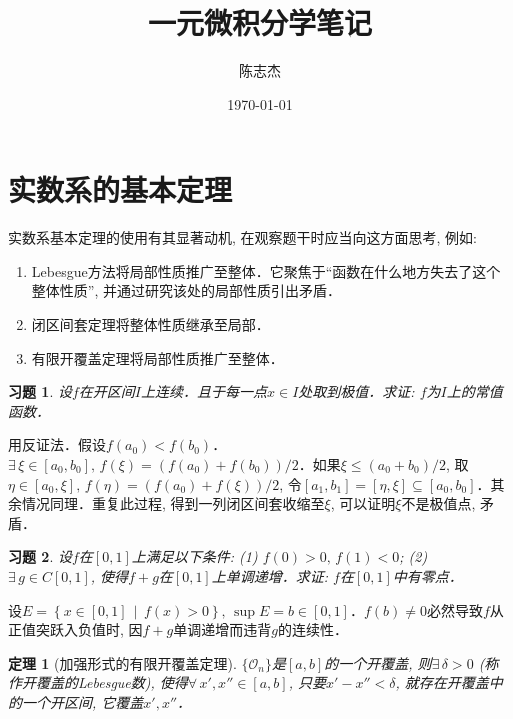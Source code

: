 \documentclass[11pt,a4paper]{ctexart}
\title{一元微积分学笔记}
\author{陈志杰}
\date{\today}
\makeatletter
\theoremstyle{thmseries} %
\newtheorem{thm}{定理}[section]
\theoremstyle{exerseries}
\newtheorem{exer}{习题}[section]
\renewenvironment{proof}[1][\proofname]{\par
  \pushQED{\qed}%
  \normalfont \topsep6\p@\@plus6\p@\relax
  \trivlist
  \item[\hskip\labelsep
        \itshape
    #1\@addpunct{}]\ignorespaces
}{%
  \popQED\endtrivlist\@endpefalse
}
\newenvironment{pf}{\begin{proof}[\bfseries\upshape 证\quad]}{\end{proof}}
\newcommand{\cbra}[1]{\mathopen{}\left\{#1\right\}}
\makeatother
\begin{document}
\maketitle
\thispagestyle{empty}
\tableofcontents
\justifying
\newpage


\section{实数系的基本定理}
实数系基本定理的使用有其显著动机, 在观察题干时应当向这方面思考, 例如: 
\begin{enumerate}
	\item Lebesgue方法将局部性质推广至整体．它聚焦于``函数在什么地方失去了这个整体性质'', 并通过研究该处的局部性质引出矛盾．
	\item 闭区间套定理将整体性质继承至局部．
	\item 有限开覆盖定理将局部性质推广至整体．
\end{enumerate}

\begin{exer}
	设$f$在开区间$I$上连续．且于每一点$x\in I$处取到极值．求证: $f$为$I$上的常值函数．
\end{exer}
\begin{pf}
	用反证法．假设$f(a_0)<f(b_0)$．$\exists\,\xi\in[a_0,b_0],\,f(\xi)=(f(a_0)+f(b_0))/2$．如果$\xi\leq(a_0+b_0)/2$, 取$\eta\in[a_0,\xi],\,f(\eta)=(f(a_0)+f(\xi))/2$, 令$[a_1,b_1]=[\eta,\xi]\subseteq[a_0,b_0]$．其余情况同理．重复此过程, 得到一列闭区间套收缩至$\xi$, 可以证明$\xi$不是极值点, 矛盾．
\end{pf}

\begin{exer}
	设$f$在$[0,1]$上满足以下条件: (1) $f(0)>0,\,f(1)<0$; (2) $\exists\,g\in C[0,1]$, 使得$f+g$在$[0,1]$上单调递增．求证: $f$在$[0,1]$中有零点．
\end{exer}
\begin{pf}
	设$E=\cbra{x\in[0,1]\,\middle\vert\,f(x)>0},\,\sup E=b\in[0,1]$．$f(b)\neq0$必然导致$f$从正值突跃入负值时, 因$f+g$单调递增而违背$g$的连续性．
\end{pf}

\begin{thm}[加强形式的有限开覆盖定理]
	$\{\mathcal{O}_n\}$是$[a,b]$的一个开覆盖, 则$\exists\,\delta>0$ (称作开覆盖的Lebesgue数), 使得$\forall\,x',x''\in[a,b]$, 只要$x'-x''<\delta$, 就存在开覆盖中的一个开区间, 它覆盖$x',x''$．
\end{thm}
\end{document}
